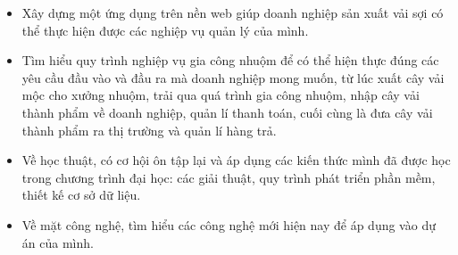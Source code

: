 \begin{itemize}
  \item Xây dựng một ứng dụng trên nền web giúp doanh nghiệp sản xuất vải sợi có thể thực hiện được các nghiệp vụ quản lý của mình.
  \item Tìm hiểu quy trình nghiệp vụ gia công nhuộm để có thể hiện thực đúng các yêu cầu đầu vào và đầu ra mà doanh nghiệp mong muốn, từ lúc xuất cây vải mộc cho xưởng nhuộm, trải qua quá trình gia công nhuộm, nhập cây vải thành phẩm về doanh nghiệp, quản lí thanh toán, cuối cùng là đưa cây vải thành phẩm ra thị trường và quản lí hàng trả.
  \item Về học thuật, có cơ hội ôn tập lại và áp dụng các kiến thức mình đã được học trong chương trình đại học: các giải thuật, quy trình phát triển phần mềm, thiết kế cơ sở dữ liệu.
  \item Về mặt công nghệ, tìm hiểu các công nghệ mới hiện nay để áp dụng vào dự án của mình.
\end{itemize}